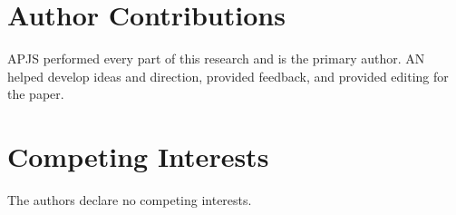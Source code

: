 \documentclass[wes, manuscript]{copernicus}
\begin{document}
\section*{Author Contributions}
APJS performed every part of this research and is the
primary author. AN helped develop ideas and direction, provided
feedback, and provided editing for the paper.

\section*{Competing Interests}
The authors declare no competing interests.





\end{document}
